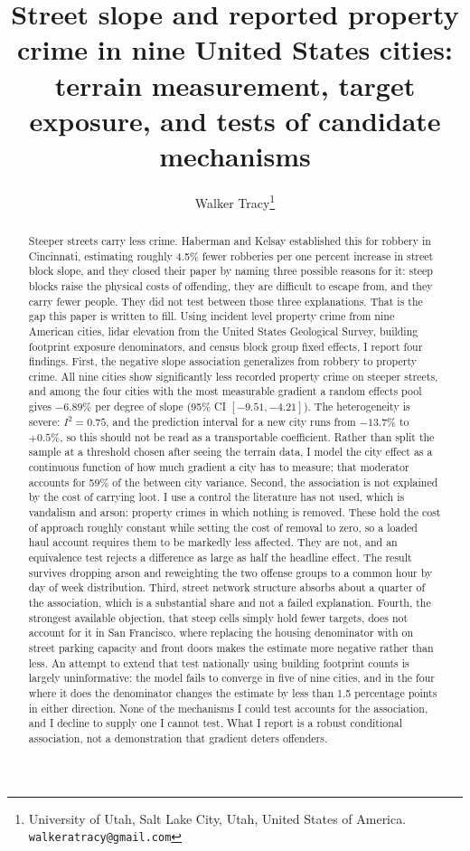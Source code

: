 \documentclass[11pt,letterpaper]{article}
\title{\bfseries Street slope and reported property crime in nine United States cities:\\ terrain measurement, target exposure, and tests of candidate mechanisms}
\author{Walker Tracy\thanks{University of Utah, Salt Lake City, Utah, United
States of America. \texttt{walkeratracy@gmail.com}}}
\date{}
\begin{document}
\maketitle


\begin{abstract}

Steeper streets carry less crime. Haberman and Kelsay established this for robbery
in Cincinnati, estimating roughly 4.5\% fewer robberies per one percent increase in
street block slope, and they closed their paper by naming three possible reasons for
it: steep blocks raise the physical costs of offending, they are difficult to escape
from, and they carry fewer people. They did not test between those three
explanations. That is the gap this paper is written to fill. Using incident level
property crime from nine American cities, lidar elevation from the United States
Geological Survey, building footprint exposure denominators, and census block group
fixed effects, I report four findings. First, the negative slope association
generalizes from robbery to property crime. All nine cities show significantly less
recorded property crime on steeper streets, and among the four cities with the most
measurable gradient a random effects pool gives $-6.89\%$ per degree of slope
(95\% CI $[-9.51, -4.21]$). The heterogeneity is severe: $I^2 = 0.75$, and the
prediction interval for a new city runs from $-13.7\%$ to $+0.5\%$, so this should
not be read as a transportable coefficient. Rather than split the sample at a
threshold chosen after seeing the terrain data, I model the city effect as a
continuous function of how much gradient a city has to measure; that moderator
accounts for 59\% of the between city variance. Second, the association is not
explained by the cost of carrying loot. I use a control the literature has not
used, which is vandalism and arson: property crimes in which nothing is removed.
These hold the cost of approach roughly constant while setting the cost of removal
to zero, so a loaded haul account requires them to be markedly less affected. They
are not, and an equivalence test rejects a difference as large as half the headline
effect. The result survives dropping arson and reweighting the two offense groups
to a common hour by day of week distribution. Third, street network structure
absorbs about a quarter of the association, which is a substantial share and not a
failed explanation. Fourth, the strongest available objection, that steep cells
simply hold fewer targets, does not account for it in San Francisco, where
replacing the housing denominator with on street parking capacity and front doors
makes the estimate more negative rather than less. An attempt to extend that test
nationally using building footprint counts is largely uninformative: the model
fails to converge in five of nine cities, and in the four where it does the
denominator changes the estimate by less than 1.5 percentage points in either
direction. None of the mechanisms I could test accounts for the association, and
I decline to supply one I cannot test. What
I report is a robust conditional association, not a demonstration that gradient
deters offenders.


\end{abstract}
\end{document}
